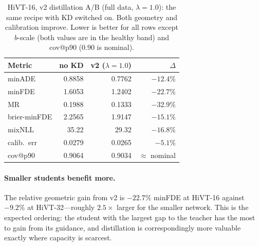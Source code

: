 \begin{table}[htbp]
  \centering
  \caption{HiVT-16, v2 distillation A/B (full data, $\lambda{=}1.0$): the same
    recipe with KD switched on. Both geometry and calibration improve. Lower is
    better for all rows except $b$-scale (both values are in the healthy band) and
    cov@p90 ($0.90$ is nominal).}
  \label{tab:ab16}
  \begin{tabular}{lrrr}
    \toprule
    Metric & no KD & v2 ($\lambda{=}1.0$) & $\Delta$ \\
    \midrule
    minADE       & 0.8858 & 0.7762 & $-12.4\%$ \\
    minFDE       & 1.6053 & 1.2402 & $-22.7\%$ \\
    MR           & 0.1988 & 0.1333 & $-32.9\%$ \\
    brier-minFDE & 2.2565 & 1.9147 & $-15.1\%$ \\
    mixNLL       & 35.22  & 29.32  & $-16.8\%$ \\
    calib.\ err  & 0.0279 & 0.0265 & $-5.1\%$ \\
    cov@p90      & 0.9064 & 0.9034 & $\approx$ nominal \\
    \bottomrule
  \end{tabular}
\end{table}

\paragraph{Smaller students benefit more.}
The relative geometric gain from v2 is $-22.7\%$ minFDE at HiVT-16 against $-9.2\%$
at HiVT-32---roughly $2.5\times$ larger for the smaller network. This is the
expected ordering: the student with the largest gap to the teacher has the most to
gain from its guidance, and distillation is correspondingly more valuable exactly
where capacity is scarcest.
